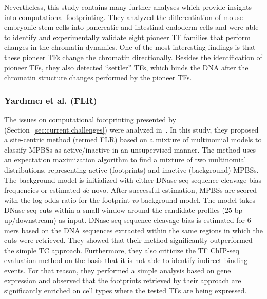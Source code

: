 Nevertheless, this study contains many further analyses which provide insights into computational footprinting. They analyzed the differentiation of mouse embryonic stem cells into pancreatic and intestinal endoderm cells and were able to identify and experimentally validate eight pioneer TF families that perform changes in the chromatin dynamics. One of the most interesting findings is that these pioneer TFs change the chromatin directionally. Besides the identification of pioneer TFs, they also detected ``settler'' TFs, which binds the DNA after the chromatin structure changes performed by the pioneer TFs.

\subsubsection{Yard{\i}mc{\i} et al. (FLR)}

The issues on computational footprinting presented by~\cite{he2014} (Section~\ref{sec:current.challenges}) were analyzed in~\cite{yardimci2014}. In this study, they proposed a site-centric method (termed FLR) based on a mixture of multinomial models to classify MPBSs as active/inactive in an unsupervised manner. The method uses an expectation maximization algorithm to find a mixture of two multinomial distributions, representing active (footprints) and inactive (background) MPBSs. The background model is initialized with either DNase-seq sequence cleavage bias frequencies or estimated {\emph de novo}. After successful estimation, MPBSs are scored with the log odds ratio for the footprint \emph{vs} background model. The model takes DNase-seq cuts within a small window around the candidate profiles ($25$ bp up/downstream) as input. DNase-seq sequence cleavage bias is estimated for $6$-mers based on the DNA sequences extracted within the same regions in which the cuts were retrieved. They showed that their method significantly outperformed the simple TC approach. Furthermore, they also criticize the TF ChIP-seq evaluation method on the basis that it is not able to identify indirect binding events. For that reason, they performed a simple analysis based on gene expression and observed that the footprints retrieved by their approach are significantly enriched on cell types where the tested TFs are being expressed.

